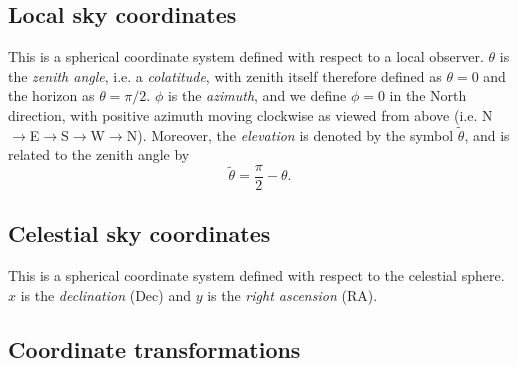 \documentclass{book}
\begin{document}
\subsection{Local sky coordinates}
\label{sec:coordslocalsky}

This is a spherical coordinate system defined with respect to a local observer.
$\theta$ is the \textit{zenith angle}, i.e. a \textit{colatitude}, with zenith itself therefore defined as $\theta = 0$ and the horizon as $\theta = \pi/2$.
$\phi$ is the \textit{azimuth}, and we define $\phi = 0$ in the North direction, with positive azimuth moving clockwise as viewed from above (i.e. N$\rightarrow$E$\rightarrow$S$\rightarrow$W$\rightarrow$N).
Moreover, the \textit{elevation} is denoted by the symbol $\tilde{\theta}$, and is related to the zenith angle by
\begin{equation}
    \tilde{\theta} = \frac{\pi}{2} - \theta.
\end{equation}

\subsection{Celestial sky coordinates}

This is a spherical coordinate system defined with respect to the celestial sphere.
$x$ is the \textit{declination} (Dec) and $y$ is the \textit{right ascension} (RA).

\subsection{Coordinate transformations}

\end{document}
